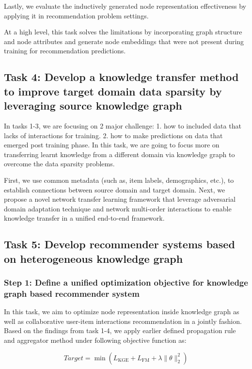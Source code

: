Lastly, we evaluate the inductively generated node representation effectiveness by applying it in recommendation problem settings. 

At a high level, this task solves the limitations by incorporating graph structure and node attributes and generate node embeddings that were not present during training for recommendation predictions.



\subsection*{Task 4: Develop a knowledge transfer method to improve target domain data sparsity by leveraging source knowledge graph }

In tasks 1-3, we are focusing on 2 major challenge: 1. how to included data that lacks of interactions for training. 2. how to make predictions on data that emerged post training phase. In this task, we are going to focus more on transferring learnt knowledge from a different domain via knowledge graph to overcome the data sparsity problems.

First, we use common metadata (such as, item labels, demographics, etc.), to establish connections between source domain and target domain. 
Next, we propose a novel network transfer learning framework that leverage  adversarial domain adaptation technique and network multi-order interactions to enable knowledge transfer in a unified end-to-end framework. 

\subsection*{Task 5: Develop recommender systems based on heterogeneous knowledge graph}

\subsubsection*{Step 1: Define a unified optimization objective for knowledge graph based recommender system}
In this task, we aim to optimize node representation inside knowledge graph as well as collaborative user-item interactions recommendation in a jointly fashion.
Based on the findings from task 1-4, we apply earlier defined propagation rule and aggregator method under following objective function as:

\begin{equation}
    Target=\min{(L_\text{KGE}+L_\text{FM}+\lambda\|\theta\|^2_2)}
\end{equation}

